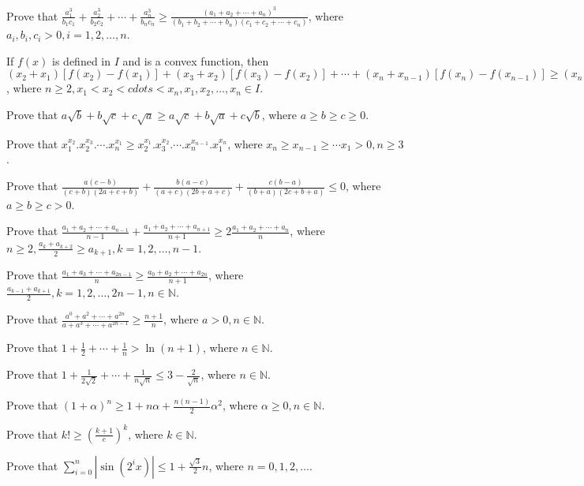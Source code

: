 \item Prove that $\frac{a_1^3}{b_1c_1} + \frac{a_2^3}{b_2c_2} + \cdots + \frac{a_n^3}{b_nc_n}\geq \frac{(a_1 + a_2 + \cdots +
  a_n)^3}{(b_1 + b_2 + \cdots + b_n)(c_1 + c_2 + \cdots + c_n)}$, where $a_i, b_i, c_i > 0, i = 1, 2, \ldots, n$.
\item If $f(x)$ is defined in $I$ and is a convex function, then $(x_2 + x_1)[f(x_2) - f(x_1)] + (x_3 + x_2)[f(x_3) - f(x_2)] +
  \cdots + (x_n + x_{n - 1})[f(x_{n}) - f(x_{n - 1})]\geq (x_n + x_1)[f(x_n) - f(x_{n - 1})]$, where $n\geq 2, x_1 < x_2 < cdots <
  x_n, x_1, x_2, \ldots, x_n\in I$.
\item Prove that $a\sqrt{b} + b\sqrt{c} + c\sqrt{a}\geq a\sqrt{c} + b\sqrt{a} + c\sqrt{b}$, where $a\geq b\geq c\geq 0$.
\item Prove that $x_1^{x_2}.x_2^{x_3}.\cdots.x_n^{x_1}\geq x_2^{x_1}.x_3^{x_2}.\cdots.x_n^{x_{n - 1}}.x_1^{x_n}$, where $x_n\geq
  x_{n - 1}\geq \cdots x_1 > 0, n\geq 3$.
\item Prove that $\frac{a(c - b)}{(c + b)(2a + c + b)} + \frac{b(a - c)}{(a + c)(2b + a + c)} + \frac{c(b - a)}{(b + a)(2c + b +
  a)}\leq 0$, where $a\geq b\geq c > 0$.
\item Prove that $\frac{a_1 + a_2 + \cdots + a_{n - 1}}{n - 1} + \frac{a_1 + a_2 + \cdots + a_{n + 1}}{n + 1}\geq 2\frac{a_1 + a_2
  + \cdots + a_n}{n}$, where $n\geq 2, \frac{a_k + a_{k + 2}}{2}\geq a_{k + 1}, k = 1, 2, \ldots, n - 1$.
\item Prove that $\frac{a_1 + a_3 + \cdots + a_{2n - 1}}{n}\geq \frac{a_0 + a_2 + \cdots + a_{2n}}{n + 1}$, where $\frac{a_{k - 1}
  + a_{k + 1}}{2}, k = 1, 2, \ldots, 2n - 1, n\in\mathbb{N}$.
\item Prove that $\frac{a^0 + a^2 + \cdots + a^{2n}}{a + a^3 + \cdots + a^{2n - 1}}\geq \frac{n + 1}{n}$, where $a > 0,
  n\in\mathbb{N}$.
\item Prove that $1 + \frac{1}{2} + \cdots + \frac{1}{n} > \ln(n + 1)$, where $n\in\mathbb{N}$.
\item Prove that $1 + \frac{1}{2\sqrt{2}} + \cdots + \frac{1}{n\sqrt{n}}\leq 3 - \frac{2}{\sqrt{n}}$, where $n\in\mathbb{N}$.
\item Prove that $(1 + \alpha)^n \geq 1 + n\alpha + \frac{n(n - 1)}{2}\alpha^2$, where $\alpha\geq 0, n\in\mathbb{N}$.
\item Prove that $k!\geq \left(\frac{k + 1}{e}\right)^k$, where $k\in\mathbb{N}$.
\item Prove that $\displaystyle\sum_{i=0}^n\left|\sin(2^ix)\right|\leq 1 + \frac{\sqrt{3}}{2}n$, where $n = 0, 1, 2, \ldots$.
